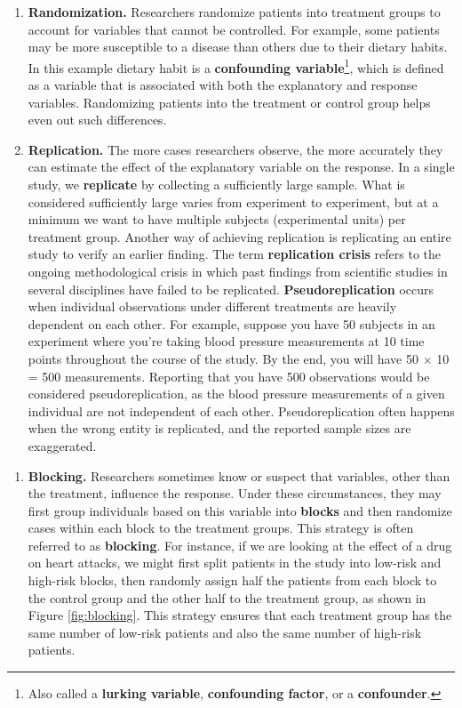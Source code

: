 \documentclass[
  10pt,
  openany]{book}
\providecommand{\tightlist}{%
  \setlength{\itemsep}{0pt}\setlength{\parskip}{0pt}}
\begin{document}
\begin{enumerate}
\def\labelenumi{\arabic{enumi}.}
\setcounter{enumi}{1}
\item
  \textbf{Randomization.} Researchers randomize patients into treatment groups to account for variables that cannot be controlled.
  For example, some patients may be more susceptible to a disease than others due to their dietary habits.
  In this example dietary habit is a \textbf{confounding variable}\footnote{Also called a \textbf{lurking variable}, \textbf{confounding factor}, or a \textbf{confounder}.}, which is defined as a variable that is associated with both the explanatory and response variables.
  Randomizing patients into the treatment or control group helps even out such differences.
\item
  \textbf{Replication.} The more cases researchers observe, the more accurately they can estimate the effect of the explanatory variable on the response.
  In a single study, we \textbf{replicate} by collecting a sufficiently large sample.
  What is considered sufficiently large varies from experiment to experiment, but at a minimum we want to have multiple subjects (experimental units) per treatment group.
  Another way of achieving replication is replicating an entire study to verify an earlier finding.
  The term \textbf{replication crisis} refers to the ongoing methodological crisis in which past findings from scientific studies in several disciplines have failed to be replicated.
  \textbf{Pseudoreplication} occurs when individual observations under different treatments are heavily dependent on each other.
  For example, suppose you have 50 subjects in an experiment where you're taking blood pressure measurements at 10 time points throughout the course of the study.
  By the end, you will have 50 \(\times\) 10 = 500 measurements.
  Reporting that you have 500 observations would be considered pseudoreplication, as the blood pressure measurements of a given individual are not independent of each other.
  Pseudoreplication often happens when the wrong entity is replicated, and the reported sample sizes are exaggerated.
\end{enumerate}

\begin{enumerate}
\def\labelenumi{\arabic{enumi}.}
\setcounter{enumi}{3}
\tightlist
\item
  \textbf{Blocking.} Researchers sometimes know or suspect that variables, other than the treatment, influence the response. Under these circumstances, they may first group individuals based on this variable into \textbf{blocks} and then randomize cases within each block to the treatment groups. This strategy is often referred to as \textbf{blocking}. For instance, if we are looking at the effect of a drug on heart attacks, we might first split patients in the study into low-risk and high-risk blocks, then randomly assign half the patients from each block to the control group and the other half to the treatment group, as shown in Figure \ref{fig:blocking}. This strategy ensures that each treatment group has the same number of low-risk patients and also the same number of high-risk patients.
\end{enumerate}
\end{document}
